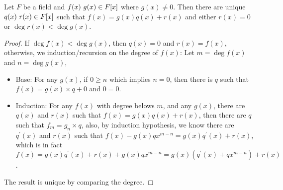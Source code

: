 \documentclass[../main.tex]{subfiles}
\begin{document}
\setcounter{theorem}{1}
\begin{theorem}
  Let $F$ be a field and $f(x) \ g(x) \in F[x]$ where $g(x) \neq 0$.
  Then there are unique $q(x) \ r(x) \in F[x]$ such that
  $f(x) = g(x)q(x) + r(x)$ and either $r(x) = 0$ or $\deg r(x) < \deg g(x)$.
\end{theorem}
\begin{proof}

  If $\deg f(x) < \deg g(x)$, then $q(x) = 0$ and $r(x) = f(x)$, 
  otherwise, we induction/recursion on the degree of $f(x)$:
  Let $m = \deg f(x)$ and $n = \deg g(x)$,
  \begin{itemize}
    \item Base: For any $g(x)$, if $0 \ge n$ which implies $n = 0$, 
      then there is $q$ such that $f(x) = g(x) \times q + 0$ and $0 = 0$.
    \item Induction: For any $f(x)$ with degree belows $m$, and any $g(x)$,
      there are $q(x)$ and $r(x)$ such that $f(x) = g(x)q(x) + r(x)$,
      then there are $q$ such that $f_m = g_n \times q$, also, by induction hypothesis,
      we know there are $q^\prime(x)$ and $r(x)$ 
      such that $f(x) - g(x)qx^{m - n} = g(x)q^\prime(x) + r(x)$,
      which is in fact $f(x) = g(x)q^\prime(x) + r(x) + g(x) qx^{m - n} = g(x) (q^\prime(x) + qx^{m - n}) + r(x)$.
  \end{itemize}

  The result is unique by comparing the degree.
\end{proof}
\end{document}
